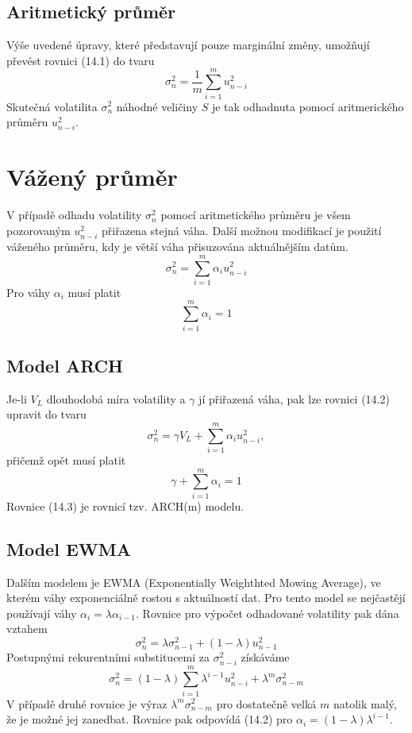 \documentclass[a4paper]{book}
\begin{document}
\subsection{Aritmetický průměr}

Výše uvedené úpravy, které představují pouze marginální změny, umožňují převést rovnici (14.1) do tvaru
\begin{equation*}
\sigma_n^2 = \frac{1}{m} \sum_{i=1}^m u_{n-i}^2
\end{equation*}
Skutečná volatilita $\sigma_n^2$ náhodné veličiny $S$ je tak odhadnuta pomocí aritmerického průměru $u_{n-i}^2$.

\section{Vážený průměr}
V případě odhadu volatility $\sigma_n^2$ pomocí aritmetického průměru je všem pozorovaným $u_{n-i}^2$ přiřazena stejná váha. Další možnou modifikací je použití váženého průměru, kdy je větší váha přisuzována aktuálnějším datům.
\begin{equation}
\sigma_n^2 = \sum_{i=1}^m \alpha_i u_{n-i}^2
\end{equation}
Pro váhy $\alpha_i$ musí platit
\begin{equation*}
\sum_{i=1}^m \alpha_i = 1
\end{equation*}

\subsection{Model ARCH}

Je-li $V_L$ dlouhodobá míra volatility a $\gamma$ jí přiřazená váha, pak lze rovnici (14.2) upravit do tvaru
\begin{equation}
\sigma_n^2 = \gamma V_L + \sum_{i=1}^m \alpha_i u_{n-i}^2,
\end{equation}
přičemž opět musí platit
\begin{equation*}
\gamma + \sum_{i=1}^{m} \alpha_i = 1
\end{equation*}
Rovnice (14.3) je rovnicí tzv. ARCH(m) modelu.

\subsection{Model EWMA}
Dalším modelem je EWMA (Exponentially Weighthted Mowing Average), ve kterém váhy exponenciálně rostou s aktuálností dat. Pro tento model se nejčastějí používají váhy $\alpha_i = \lambda \alpha_{i-1}$. Rovnice pro výpočet odhadované volatility pak dána vztahem
\begin{equation*}
\sigma_n^2= \lambda \sigma_{n-1}^2 + (1-\lambda)u_{n-1}^2
\end{equation*}
Postupnými rekurentními substitucemi za $\sigma_{n-i}^2$ získáváme
\begin{equation*}
\sigma_n^2 = (1-\lambda) \sum_{i=1}^m \lambda^{i-1}u_{n-i}^2+\lambda^m \sigma_{n-m}^2
\end{equation*}
V případě druhé rovnice je výraz $\lambda^m \sigma_{n-m}^2$ pro dostatečně velká $m$ natolik malý, že je možné jej zanedbat. Rovnice pak odpovídá (14.2) pro $\alpha_i = (1-\lambda)\lambda^{i-1}$.
\end{document}
